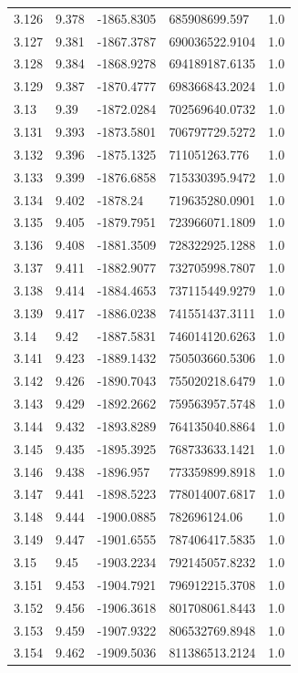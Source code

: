 \begin{tabular}{lllll}
3.126 & 9.378 & -1865.8305 & 685908699.597 & 1.0 \\
3.127 & 9.381 & -1867.3787 & 690036522.9104 & 1.0 \\
3.128 & 9.384 & -1868.9278 & 694189187.6135 & 1.0 \\
3.129 & 9.387 & -1870.4777 & 698366843.2024 & 1.0 \\
3.13 & 9.39 & -1872.0284 & 702569640.0732 & 1.0 \\
3.131 & 9.393 & -1873.5801 & 706797729.5272 & 1.0 \\
3.132 & 9.396 & -1875.1325 & 711051263.776 & 1.0 \\
3.133 & 9.399 & -1876.6858 & 715330395.9472 & 1.0 \\
3.134 & 9.402 & -1878.24 & 719635280.0901 & 1.0 \\
3.135 & 9.405 & -1879.7951 & 723966071.1809 & 1.0 \\
3.136 & 9.408 & -1881.3509 & 728322925.1288 & 1.0 \\
3.137 & 9.411 & -1882.9077 & 732705998.7807 & 1.0 \\
3.138 & 9.414 & -1884.4653 & 737115449.9279 & 1.0 \\
3.139 & 9.417 & -1886.0238 & 741551437.3111 & 1.0 \\
3.14 & 9.42 & -1887.5831 & 746014120.6263 & 1.0 \\
3.141 & 9.423 & -1889.1432 & 750503660.5306 & 1.0 \\
3.142 & 9.426 & -1890.7043 & 755020218.6479 & 1.0 \\
3.143 & 9.429 & -1892.2662 & 759563957.5748 & 1.0 \\
3.144 & 9.432 & -1893.8289 & 764135040.8864 & 1.0 \\
3.145 & 9.435 & -1895.3925 & 768733633.1421 & 1.0 \\
3.146 & 9.438 & -1896.957 & 773359899.8918 & 1.0 \\
3.147 & 9.441 & -1898.5223 & 778014007.6817 & 1.0 \\
3.148 & 9.444 & -1900.0885 & 782696124.06 & 1.0 \\
3.149 & 9.447 & -1901.6555 & 787406417.5835 & 1.0 \\
3.15 & 9.45 & -1903.2234 & 792145057.8232 & 1.0 \\
3.151 & 9.453 & -1904.7921 & 796912215.3708 & 1.0 \\
3.152 & 9.456 & -1906.3618 & 801708061.8443 & 1.0 \\
3.153 & 9.459 & -1907.9322 & 806532769.8948 & 1.0 \\
3.154 & 9.462 & -1909.5036 & 811386513.2124 & 1.0 \\

\end{tabular}
